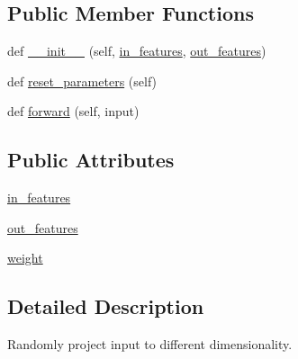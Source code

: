 \subsection*{Public Member Functions}
\begin{DoxyCompactItemize}
\item 
def \hyperlink{classparlai_1_1agents_1_1legacy__agents_1_1seq2seq_1_1modules__v0_1_1RandomProjection_ab509b80358309b000bdd54ff89117ae5}{\+\_\+\+\_\+init\+\_\+\+\_\+} (self, \hyperlink{classparlai_1_1agents_1_1legacy__agents_1_1seq2seq_1_1modules__v0_1_1RandomProjection_a746c126e0335761df8b17d83b11827c6}{in\+\_\+features}, \hyperlink{classparlai_1_1agents_1_1legacy__agents_1_1seq2seq_1_1modules__v0_1_1RandomProjection_a96b2dfcaec3fee60b2874e451474a38c}{out\+\_\+features})
\item 
def \hyperlink{classparlai_1_1agents_1_1legacy__agents_1_1seq2seq_1_1modules__v0_1_1RandomProjection_a8658f06bff792a0c09d106950a6267fe}{reset\+\_\+parameters} (self)
\item 
def \hyperlink{classparlai_1_1agents_1_1legacy__agents_1_1seq2seq_1_1modules__v0_1_1RandomProjection_aa827034c53df417f2eedac25f581a88d}{forward} (self, input)
\end{DoxyCompactItemize}
\subsection*{Public Attributes}
\begin{DoxyCompactItemize}
\item 
\hyperlink{classparlai_1_1agents_1_1legacy__agents_1_1seq2seq_1_1modules__v0_1_1RandomProjection_a746c126e0335761df8b17d83b11827c6}{in\+\_\+features}
\item 
\hyperlink{classparlai_1_1agents_1_1legacy__agents_1_1seq2seq_1_1modules__v0_1_1RandomProjection_a96b2dfcaec3fee60b2874e451474a38c}{out\+\_\+features}
\item 
\hyperlink{classparlai_1_1agents_1_1legacy__agents_1_1seq2seq_1_1modules__v0_1_1RandomProjection_a6564c7d7b6296013fc59706c0c32267e}{weight}
\end{DoxyCompactItemize}


\subsection{Detailed Description}
\begin{DoxyVerb}Randomly project input to different dimensionality.\end{DoxyVerb}
 

